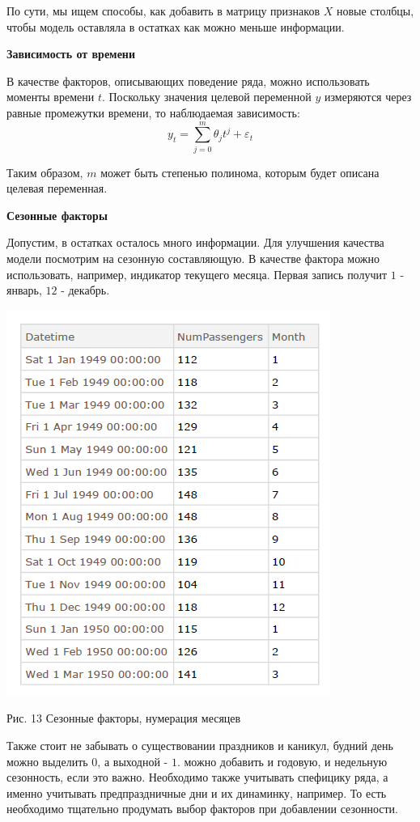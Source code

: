 \documentclass[aps,%
12pt,%
final,%
oneside,
onecolumn,%
musixtex, %
superscriptaddress,%
centertags]{article} %
\theoremstyle{plain}
\theoremstyle{definition}
\theoremstyle{remark}
\begin{document}
По сути, мы ищем способы, как добавить в матрицу признаков $X$ новые столбцы, чтобы модель оставляла в остатках как можно меньше информации.

\textbf{Зависимость от времени}

В качестве факторов, описывающих поведение ряда, можно использовать моменты времени $t$. Поскольку значения целевой переменной $y$ измеряются через равные промежутки времени, то наблюдаемая зависимость:
$$y_t = \sum\limits_{j=0}^m \theta_jt^j + \varepsilon_t$$

Таким образом, $m$ может быть степенью полинома, которым будет описана целевая переменная.

\textbf{Сезонные факторы}

Допустим, в остатках осталось много информации. Для улучшения качества модели посмотрим на сезонную составляющую. В качестве фактора можно использовать, например, индикатор текущего месяца. Первая запись получит $1$ - январь, $12$ - декабрь.

\begin{center}
	\includegraphics[scale=0.5]{images/13.png}

	Рис. 13 Сезонные факторы, нумерация месяцев
\end{center}

Также стоит не забывать о существовании праздников и каникул, будний день можно выделить $0$, а выходной - $1$. можно добавить и годовую, и недельную сезонность, если это важно. Необходимо также учитывать спефицику ряда, а именно учитывать предпраздничные дни и их динаминку, например. То есть необходимо тщательно продумать выбор факторов при добавлении сезонности.
\end{document}
